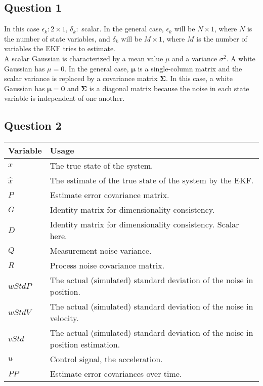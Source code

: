 \subsection{Question 1}
	In this case $\epsilon_k: 2 \times 1$, $\delta_k:$ scalar. In the general case, $\epsilon_k$ will be $N \times 1$, where $N$ is
	the number of state variables, and $\delta_k$ will be $M \times 1$, where $M$ is the number of variables the EKF tries to estimate.
	\\
	A scalar Gaussian is characterized by a mean value $\mu$ and a variance $\sigma^2$. A white Gaussian has $\mu = 0$.
	In the general case, $\boldsymbol{\mu}$ is a single-column matrix and the scalar variance is replaced by a covariance matrix
	$\boldsymbol{\Sigma}$. In this case, a white Gaussian has $\boldsymbol{\mu} = \boldsymbol{0}$ and $\boldsymbol{\Sigma}$ is a
	diagonal matrix because the noise in each state variable is independent of one another.

\subsection{Question 2}

\begin{table}[!htb]
	\centering
    \begin{tabular}{l|l}
    Variable & Usage                                                    \\ \hline
    $x$        & The true state of the system.							  \\
    $\hat{x}$  & The estimate of the true state of the system by the EKF.\\
    $P$        & Estimate error covariance matrix.                       \\
    $G$        & Identity matrix for dimensionality consistency.          \\
    $D$        & Identity matrix for dimensionality consistency. Scalar here. \\
    $Q$        & Measurement noise variance.         \\
    $R$        & Process noise covariance matrix.                    \\
    $wStdP$    & The actual (simulated) standard deviation of the noise in position.            \\
    $wStdV$    & The actual (simulated) standard deviation of the noise in velocity.            \\
    $vStd$     & The actual (simulated) standard deviation of the noise in position estimation. \\
    $u$        & Control signal, the acceleration.                       \\
    $PP$       & Estimate error covariances over time.                              \\
    \end{tabular}
\end{table}


